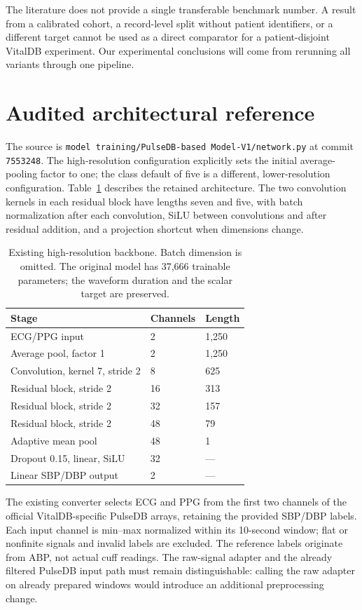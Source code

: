 \documentclass[11pt]{article}
\begin{document}
The literature does not provide a single transferable benchmark number. A result from a calibrated cohort, a record-level split without patient identifiers, or a different target cannot be used as a direct comparator for a patient-disjoint VitalDB experiment. Our experimental conclusions will come from rerunning all variants through one pipeline.

\section{Audited architectural reference}
The source is \texttt{model training/}\allowbreak\texttt{PulseDB-based Model-V1/network.py} at commit \texttt{7553248}. The high-resolution configuration explicitly sets the initial average-pooling factor to one; the class default of five is a different, lower-resolution configuration. Table~\ref{tab:backbone} describes the retained architecture. The two convolution kernels in each residual block have lengths seven and five, with batch normalization after each convolution, SiLU between convolutions and after residual addition, and a projection shortcut when dimensions change.

\begin{table}[t]
\centering\small
\begin{tabular}{lll}
\toprule
Stage & Channels & Length\\
\midrule
ECG/PPG input & 2 & 1,250\\
Average pool, factor 1 & 2 & 1,250\\
Convolution, kernel 7, stride 2 & 8 & 625\\
Residual block, stride 2 & 16 & 313\\
Residual block, stride 2 & 32 & 157\\
Residual block, stride 2 & 48 & 79\\
Adaptive mean pool & 48 & 1\\
Dropout 0.15, linear, SiLU & 32 & ---\\
Linear SBP/DBP output & 2 & ---\\
\bottomrule
\end{tabular}
\caption{Existing high-resolution backbone. Batch dimension is omitted. The original model has 37,666 trainable parameters; the waveform duration and the scalar target are preserved.}
\label{tab:backbone}
\end{table}

The existing converter selects ECG and PPG from the first two channels of the official VitalDB-specific PulseDB arrays, retaining the provided SBP/DBP labels. Each input channel is min--max normalized within its 10-second window; flat or nonfinite signals and invalid labels are excluded. The reference labels originate from ABP, not actual cuff readings. The raw-signal adapter and the already filtered PulseDB input path must remain distinguishable: calling the raw adapter on already prepared windows would introduce an additional preprocessing change.
\end{document}
